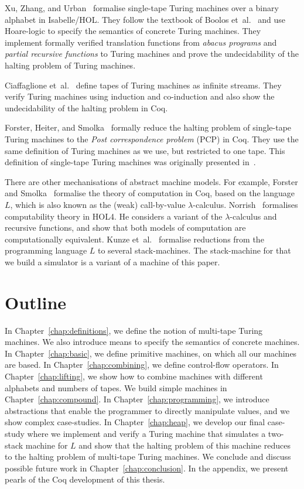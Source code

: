 Xu, Zhang, and Urban~\cite{xu2013} formalise single-tape Turing machines over a binary alphabet in Isabelle/HOL.  They follow the textbook of Boolos
et~al.~\cite{boolos2007computability} and use Hoare-logic to specify the semantics of concrete Turing machines.  They implement formally verified
translation functions from \textit{abacus programs} and \textit{partial recursive functions} to Turing machines and prove the undecidability of the
halting problem of Turing machines.

Ciaffaglione et~al.~\cite{ciaffaglione2016} define tapes of Turing machines as infinite streams.  They verify Turing machines using induction and
co-induction and also show the undecidability of the halting problem in Coq.

Forster, Heiter, and Smolka~\cite{forster2018verification} formally reduce the halting problem of single-tape Turing machines to the \textit{Post
  correspondence problem} (PCP) in Coq.  They use the same definition of Turing machines as we use, but restricted to one tape.  This definition of
single-tape Turing machines was originally presented in~\cite{asperti2012}.

There are other mechanisations of abstract machine models.  For example, Forster and Smolka~\cite{forster2017weak} formalise the theory of computation
in Coq, based on the language~$L$, which is also known as the (weak) call-by-value $\lambda$-calculus.  Norrish~\cite{norrish2011mechanised}
formalises computability theory in HOL4.  He considers a variant of the $\lambda$-calculus and recursive functions, and show that both models of
computation are computationally equivalent.  Kunze et~al.~\cite{KunzeEtAl:2018:Formal} formalise reductions from the programming language $L$ to
several stack-machines.  The stack-machine for that we build a simulator is a variant of a machine of this paper.



\section{Outline}
\label{sec:outline}

In Chapter~\ref{chap:definitions}, we define the notion of multi-tape Turing machines.  We also introduce means to specify the semantics of concrete
machines.  In Chapter~\ref{chap:basic}, we define primitive machines, on which all our machines are based.  In Chapter~\ref{chap:combining}, we define
control-flow operators.  In Chapter~\ref{chap:lifting}, we show how to combine machines with different alphabets and numbers of tapes.  We build
simple machines in Chapter~\ref{chap:compound}.  In Chapter~\ref{chap:programming}, we introduce abstractions that enable the programmer to directly
manipulate values, and we show complex case-studies.  In Chapter~\ref{chap:heap}, we develop our final case-study where we implement and verify a
Turing machine that simulates a two-stack machine for $L$ and show that the halting problem of this machine reduces to the halting problem of
multi-tape Turing machines.  We conclude and discuss possible future work in Chapter~\ref{chap:conclusion}.  In the appendix, we present pearls of the
Coq development of this thesis.

